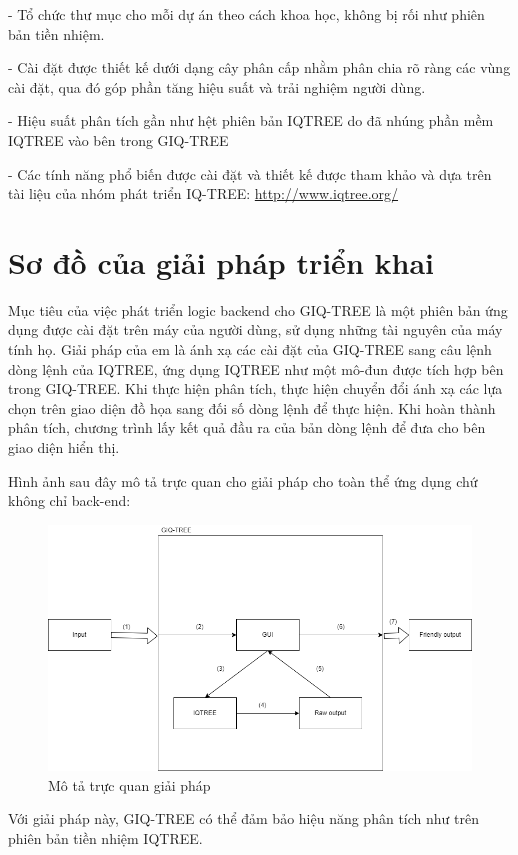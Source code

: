 \documentclass[12pt]{report}
\begin{document}
- Tổ chức thư mục cho mỗi dự án theo cách khoa học, không bị rối như phiên bản tiền nhiệm.

- Cài đặt được thiết kế dưới dạng cây phân cấp nhằm phân chia rõ ràng các vùng cài đặt, qua đó góp phần tăng hiệu suất và trải nghiệm người dùng.

- Hiệu suất phân tích gần như hệt phiên bản IQTREE do đã nhúng phần mềm IQTREE vào bên trong GIQ-TREE

- Các tính năng phổ biến được cài đặt và thiết kế được tham khảo và dựa trên tài liệu của nhóm phát triển IQ-TREE: \url{http://www.iqtree.org/}

\section{Sơ đồ của giải pháp triển khai}
Mục tiêu của việc phát triển logic backend cho GIQ-TREE là một phiên bản ứng dụng được cài đặt trên máy của người dùng, sử dụng những tài nguyên của máy tính họ. Giải pháp của em là ánh xạ các cài đặt của GIQ-TREE sang câu lệnh dòng lệnh của IQTREE, ứng dụng IQTREE như một mô-đun được tích hợp bên trong GIQ-TREE. Khi thực hiện phân tích, thực hiện chuyển đổi ánh xạ các lựa chọn trên giao diện đồ họa sang đối số dòng lệnh để thực hiện. Khi hoàn thành phân tích, chương trình lấy kết quả đầu ra của bản dòng lệnh để đưa cho bên giao diện hiển thị.

Hình ảnh sau đây mô tả trực quan cho giải pháp cho toàn thể ứng dụng chứ không chỉ back-end:

\begin{figure}[h]
	\centering
	\includegraphics[scale=0.55]{Image/1.3.png}
	\caption{Mô tả trực quan giải pháp}
	\label{fig:image1.3}
\end{figure}

Với giải pháp này, GIQ-TREE có thể đảm bảo hiệu năng phân tích như trên phiên bản tiền nhiệm IQTREE.
\end{document}
